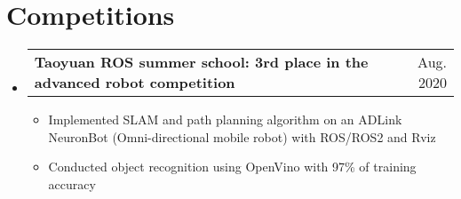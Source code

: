 \documentclass[a4paper, 11pt]{article}
\makeatletter
\newcommand{\resumeItem}[1]{
  \item\small{
    {#1 \vspace{-3pt}}
  }
}
\newcommand{\resumeProjectHeading}[2]{
    \item
    \begin{tabular*}{0.97\textwidth}{l@{\extracolsep{\fill}}r}
      \small#1 & \small #2 \\
    \end{tabular*}\vspace{-7pt}
}
\newcommand{\resumeSubHeadingListStart}{\begin{itemize}[leftmargin=0.15in, label={}]}
\newcommand{\resumeSubHeadingListEnd}{\end{itemize}}
\newcommand{\resumeItemListStart}{\begin{itemize}}
\newcommand{\resumeItemListEnd}{\end{itemize}\vspace{-5pt}}
\makeatother
\begin{document}
             
          
          



  \vspace{-0.5cm}
\section{\textbf{Competitions}}
    \resumeSubHeadingListStart
    \resumeProjectHeading
          {\textbf{Taoyuan ROS summer school: 3rd place in the advanced robot competition}}{Aug. 2020}
          \resumeItemListStart
            \resumeItem{Implemented SLAM and path planning algorithm on an ADLink NeuronBot (Omni-directional mobile robot) with ROS/ROS2 and Rviz}
            
            \resumeItem{Conducted object recognition using OpenVino with 97\% of training accuracy}
          \resumeItemListEnd
          
          
          
    \resumeSubHeadingListEnd    



\end{document}
